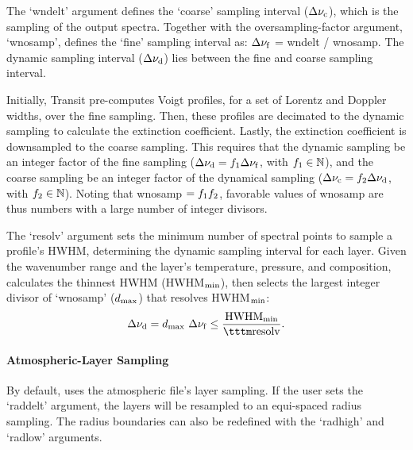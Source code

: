 \documentclass[letterpaper, 12pt]{article}
\begin{document}
The `{\tttb wndelt}' argument defines the `coarse' sampling interval
($\Delta\nu\sb{\rm c}$), which is the sampling of the output spectra.
Together with the oversampling-factor argument, `{\tttb wnosamp}',
{\transit} defines the `fine' sampling interval as: $\Delta\nu\sb{\rm
  f}$ = {\tttb wndelt / wnosamp}.  The dynamic sampling interval
($\Delta\nu\sb{\rm d}$) lies between the fine and coarse sampling
interval.

Initially, Transit pre-computes Voigt profiles, for a set of Lorentz
and Doppler widths, over the fine sampling.  Then, these profiles are
decimated to the dynamic sampling to calculate the extinction
coefficient.  Lastly, the extinction coefficient is downsampled to the
coarse sampling.  This requires that the dynamic sampling be an
integer factor of the fine sampling ($\Delta\nu\sb{\rm d} =
f\sb{1}\Delta\nu\sb{\rm f}$, with $f\sb{1}\in\mathbb{N}$), and the
coarse sampling be an integer factor of the dynamical sampling
($\Delta\nu\sb{\rm c} = f\sb{2}\Delta\nu\sb{\rm d}$, with
$f\sb{2}\in\mathbb{N}$).  Noting that {\tttb wnosamp} $=
f\sb{1}f\sb{2}$, favorable values of {\tttb wnosamp} are thus numbers
with a large number of integer divisors.

The `{\tttb resolv}' argument  sets the minimum
number of spectral points to sample a profile's HWHM, determining the
dynamic sampling interval for each layer.
Given the wavenumber range and the layer's temperature, pressure, and
composition, {\transit} calculates the thinnest HWHM (HWHM$\sb{\rm
  min}$), then {\transit} selects the largest integer divisor of
{\tttm `wnosamp'} ($d\sb{\rm max}$) that resolves HWHM$\sb{\rm min}$:
\begin{equation}
  \Delta\nu\sb{\rm d} =    d\sb{\rm max}\ \Delta\nu\sb{\rm f} 
                      \leq \frac{\rm HWHM\sb{min}}{\tttm \rm{resolv}}.
\end{equation}



\paragraph{Atmospheric-Layer  Sampling}

By default, {\transit} uses the atmospheric file's layer sampling.  If
the user sets the `{\tttb raddelt}' argument, the layers will be
resampled to an equi-spaced radius sampling.  The radius boundaries
can also be redefined with the `{\tttb radhigh}' and `{\tttb radlow}'
arguments.
\end{document}
